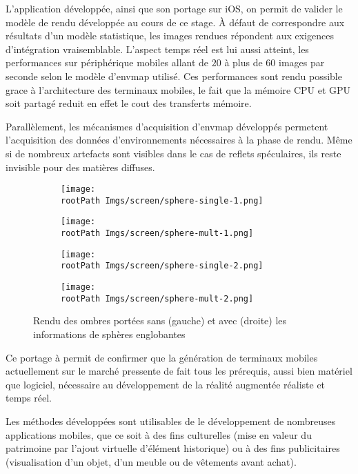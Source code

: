 \documentclass[10pt,a4paper,twoside, twocolumn]{report}
\newcommand*{\rootPath}{../}
\begin{document}
\iftwocolumn \begin{multicols}{2} \fi
L’application développée, ainsi que son portage sur iOS, on permit de valider le modèle de rendu développée au cours de ce stage. À défaut de correspondre aux résultats d’un modèle statistique, les images rendues répondent aux exigences d’intégration vraisemblable. L’aspect temps réel est lui aussi atteint, les performances sur périphérique mobiles allant de $20$ à plus de $60$ images par seconde selon le modèle d’envmap utilisé. Ces performances sont rendu possible grace à l’architecture des terminaux mobiles, le fait que la mémoire CPU et GPU soit partagé reduit en effet le cout des transferts mémoire.

Parallèlement, les mécanismes d’acquisition d’envmap développés permetent l’acquisition des données d’environnements nécessaires à la phase de rendu. Même si de nombreux artefacts sont visibles dans le cas de reflets spéculaires, ils reste invisible pour des matières diffuses. 
\iftwocolumn \end{multicols} \fi


\begin{figure*}[!ht]\centering

	\begin{subfigure}[b]{0.45\textwidth}\centering
		\texttt{[image: \\rootPath Imgs/screen/sphere-single-1.png]}
	\end{subfigure}
	\begin{subfigure}[b]{0.45\textwidth}\centering
		\texttt{[image: \\rootPath Imgs/screen/sphere-mult-1.png]}
	\end{subfigure}
	
	\begin{subfigure}[b]{0.45\textwidth}\centering
		\texttt{[image: \\rootPath Imgs/screen/sphere-single-2.png]}
	\end{subfigure}
	\begin{subfigure}[b]{0.45\textwidth}\centering
		\texttt{[image: \\rootPath Imgs/screen/sphere-mult-2.png]}
	\end{subfigure}
	
	\caption{Rendu des ombres portées sans (gauche) et avec (droite) les informations de sphères englobantes}
	\label{fig:result:spheres}
\end{figure*}


\iftwocolumn \begin{multicols}{2} \fi
Ce portage à permit de confirmer que la génération de terminaux mobiles actuellement sur le marché pressente de fait tous les prérequis, aussi bien matériel que logiciel, nécessaire au développement de la réalité augmentée réaliste et temps réel.

Les méthodes développées sont utilisables de le développement de nombreuses applications mobiles, que ce soit à des fins culturelles (mise en valeur du patrimoine par l’ajout virtuelle d’élément historique) ou à des fins publicitaires (visualisation d’un objet, d’un meuble ou de vêtements avant achat).
\iftwocolumn \end{multicols} \fi
\end{document}
